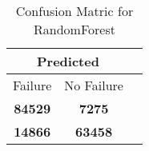 \begin{table}[] 
\caption{Confusion Matric for RandomForest} 
\label{Table: Prediction Accuracy-DMDRandomForestOnlySunEKF-ignoreReflection-Reflection} 
\centering 
\begin{tabular} 
 {@{}ccc@{}} 
\toprule 
\multicolumn{2}{c}{\textbf{Predicted}}
 \\ \midrule 
\multicolumn{1}{|c|}{Failure} & 
\multicolumn{1}{c|}{No Failure}
 \\ \midrule 
\multicolumn{1}{|c|}{\color{green}\textbf{84529}} & 
\multicolumn{1}{c|}{\color{red}\textbf{7275}}
 \\ \midrule 
\multicolumn{1}{|c|}{\color{red}\textbf{14866}} & 
\multicolumn{1}{c|}{\color{green}\textbf{63458}}
 \\ \bottomrule 
\end{tabular} 
\end{table} 
